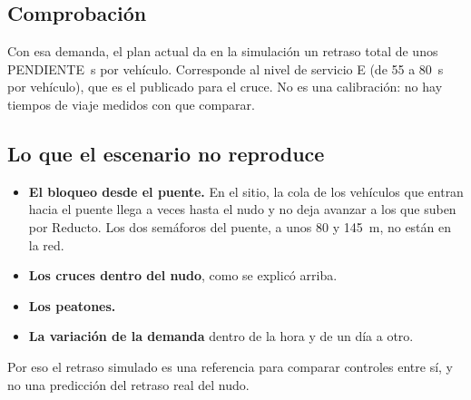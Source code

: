 \begin{table}[!tbp]
\centering
\footnotesize

\caption[Caso Lima: demanda por entrada y destino]{Caso Lima: demanda supuesta en la hora punta de la tarde (veh/h), por entrada y destino. El total es el publicado; el reparto es un supuesto.}
\label{tab:lima-demanda}
\end{table}

\subsection*{Comprobación}

Con esa demanda, el plan actual da en la simulación un retraso total de
unos PENDIENTE~s por vehículo. Corresponde al nivel de servicio E (de 55
a 80~s por vehículo), que es el publicado para el cruce. No es una
calibración: no hay tiempos de viaje medidos con que comparar.

\subsection*{Lo que el escenario no reproduce}

\begin{itemize}
  \item \textbf{El bloqueo desde el puente.} En el sitio, la cola de
    los vehículos que entran hacia el puente llega a veces hasta el nudo
    y no deja avanzar a los que suben por Reducto. Los dos semáforos del
    puente, a unos 80 y 145~m, no están en la red.
  \item \textbf{Los cruces dentro del nudo}, como se explicó arriba.
  \item \textbf{Los peatones.}
  \item \textbf{La variación de la demanda} dentro de la hora y de un
    día a otro.
\end{itemize}
Por eso el retraso simulado es una referencia para comparar controles
entre sí, y no una predicción del retraso real del nudo.

